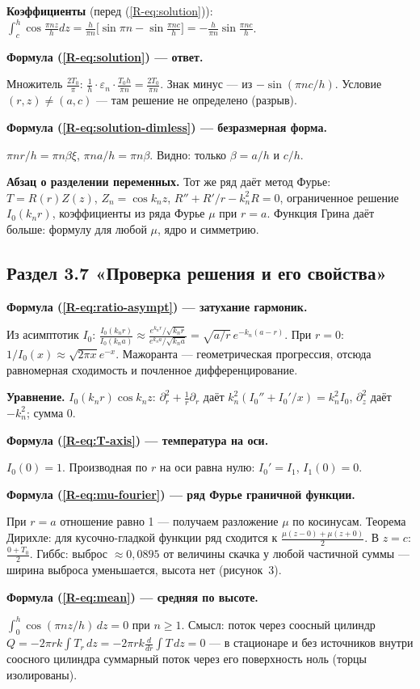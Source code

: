 \documentclass[a4paper,12pt]{article}
\renewcommand{\ge}{\geqslant}
\newcommand{\rf}[1]{(\ref*{R-#1})}
\newcommand{\fhead}[2]{\par\medskip\textbf{Формула #1 — #2.}\par\nopagebreak[4]}
\begin{document}
\textbf{Коэффициенты} (перед \rf{eq:solution}):
$\int_c^h\cos\frac{\pi nz}{h}dz=\frac{h}{\pi n}\bigl[\sin\pi n
-\sin\frac{\pi nc}{h}\bigr]=-\frac{h}{\pi n}\sin\frac{\pi nc}{h}$.

\fhead{\rf{eq:solution}}{ответ}
Множитель $\frac{2T_0}{\pi}$: $\frac{1}{h}\cdot\varepsilon_n\cdot
\frac{T_0h}{\pi n}=\frac{2T_0}{\pi n}$. Знак минус — из
$-\sin(\pi nc/h)$. Условие $(r,z)\ne(a,c)$ — там решение не определено
(разрыв).

\fhead{\rf{eq:solution-dimless}}{безразмерная форма}
$\pi nr/h=\pi n\beta\xi$, $\pi na/h=\pi n\beta$. Видно: только $\beta=a/h$
и $c/h$.

\textbf{Абзац о разделении переменных.} Тот же ряд даёт метод Фурье:
$T=R(r)Z(z)$, $Z_n=\cos k_nz$, $R''+R'/r-k_n^2R=0$, ограниченное решение
$I_0(k_nr)$, коэффициенты из ряда Фурье $\mu$ при $r=a$. Функция Грина
даёт больше: формулу для любой $\mu$, ядро и симметрию.

\subsection{Раздел 3.7 «Проверка решения и его свойства»}

\fhead{\rf{eq:ratio-asympt}}{затухание гармоник}
Из асимптотик $I_0$:
$\frac{I_0(k_nr)}{I_0(k_na)}\approx\frac{e^{k_nr}/\sqrt{k_nr}}{e^{k_na}/\sqrt{k_na}}
=\sqrt{a/r}\,e^{-k_n(a-r)}$. При $r=0$: $1/I_0(x)\approx\sqrt{2\pi x}e^{-x}$.
Мажоранта — геометрическая прогрессия, отсюда равномерная сходимость
и почленное дифференцирование.

\textbf{Уравнение.} $I_0(k_nr)\cos k_nz$: $\partial_r^2+\frac1r\partial_r$
даёт $k_n^2(I_0''+I_0'/x)=k_n^2I_0$, $\partial_z^2$ даёт $-k_n^2$; сумма 0.

\fhead{\rf{eq:T-axis}}{температура на оси}
$I_0(0)=1$. Производная по $r$ на оси равна нулю: $I_0'=I_1$, $I_1(0)=0$.

\fhead{\rf{eq:mu-fourier}}{ряд Фурье граничной функции}
При $r=a$ отношение равно 1 — получаем разложение $\mu$ по косинусам.
Теорема Дирихле: для кусочно-гладкой функции ряд сходится к
$\frac{\mu(z-0)+\mu(z+0)}{2}$. В $z=c$: $\frac{0+T_0}{2}$.
Гиббс: выброс $\approx0{,}0895$ от величины скачка у любой частичной
суммы — ширина выброса уменьшается, высота нет (рисунок~3).

\fhead{\rf{eq:mean}}{средняя по высоте}
$\int_0^h\cos(\pi nz/h)\,dz=0$ при $n\ge1$. Смысл: поток через соосный
цилиндр $Q=-2\pi rk\int T_r\,dz=-2\pi rk\frac{d}{dr}\int T\,dz=0$ —
в стационаре и без источников внутри соосного цилиндра суммарный поток
через его поверхность ноль (торцы изолированы).
\end{document}
